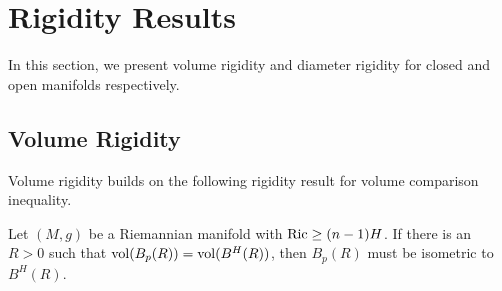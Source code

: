 \section{Rigidity Results}

In this section, we present volume rigidity and diameter rigidity for closed and open manifolds respectively.

\subsection{Volume Rigidity}

Volume rigidity builds on the following rigidity result for volume comparison inequality.
\begin{prop}\label{prop:volume rigidity}
    Let $(M,g)$ be a Riemannian manifold with $\operatorname{Ric}\geq(n-1)H$.
    If there is an $R>0$ such that $\operatorname{vol}(B_p(R))=\operatorname{vol}(B^H(R))$, then $B_p(R)$ must be isometric to $B^H(R)$.
\end{prop}
